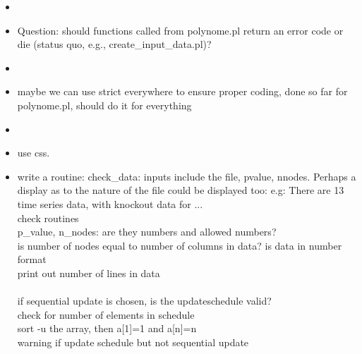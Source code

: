 \documentclass[10pt]{article}
\begin{document}
\begin{itemize}
    \item {}
    \item Question: should functions called from polynome.pl return an error
    code or die (status quo, e.g., create\_input\_data.pl)?
    \item {}
    \item maybe we can use strict everywhere to ensure proper coding, done so
    far for polynome.pl, should do it for everything
    \item {}
    \item use css.  
    \item write a routine: check\_data: inputs include the file, pvalue, nnodes.
    Perhaps a display as to the nature of the file could be displayed too:
    e.g: There are 13 time series data, with knockout data for ...\\
    check routines\\
     p\_value, n\_nodes: are they numbers and allowed numbers?\\
     is number of nodes equal to number of columns in data? is data in number format\\
     print out number of lines in data\\
\\
     if sequential update is chosen, is the updateschedule valid?\\
     check for number of elements in schedule\\
     sort -u the array, then a[1]=1 and a[n]=n\\
     warning if update schedule but not sequential update\\


\end{itemize}
\end{document}

